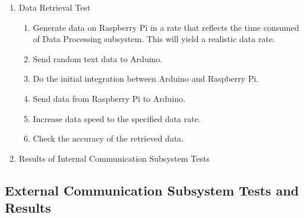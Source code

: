 \documentclass[a4paper,12pt]{article}
\begin{document}
\begin{enumerate}

\item Data Retrieval Test

\begin{enumerate}

\item Generate data on Raspberry Pi in a rate that reflects the time consumed of Data Processing subsystem. This will yield a realistic data rate.  

\item Send random text data to Arduino.  

\item Do the initial integration between Arduino and Raspberry Pi.  

\item Send data from Raspberry Pi to Arduino.  

\item Increase data speed to the specified data rate.  

\item Check the accuracy of the retrieved data. 

\end{enumerate}




\item{Results of Internal Communication Subsystem Tests}


\end{enumerate}





\subsection {External Communication Subsystem Tests and Results}
\end{document}

